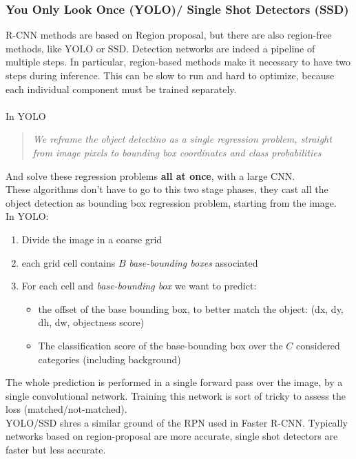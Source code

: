 \subsubsection{You Only Look Once (YOLO)/ Single Shot Detectors (SSD)}
R-CNN methods are based on Region proposal, but there are also region-free methods, like YOLO or SSD. Detection networks are indeed a pipeline of multiple steps. In particular, region-based methods make it necessary to have two steps during inference. This can be slow to run and hard to optimize, because each individual component must be trained separately.\\ \\
In YOLO 
\begin{quote}
    \textit{We reframe the object detectino as a single regression problem, straight from image pixels to bounding box coordinates and class probabilities}
\end{quote}{}
And solve these regression problems \textbf{all at once}, with a large CNN. \\
These algorithms don't have to go to this two stage phases, they cast all the object detection as bounding box regression problem, starting from the image. \\

In YOLO: 
\begin{enumerate}
    \item Divide the image in a coarse grid
    \item each grid cell contains $B$ \textit{base-bounding boxes} associated
    \item For each cell and \textit{base-bounding box} we want to predict: 
    \begin{itemize}
        \item the offset of the base bounding box, to better match the object: (dx, dy, dh, dw, objectness score)
        \item The classification score of the base-bounding box over the $C$ considered categories (including background)
    \end{itemize}{}
\end{enumerate}{}

The whole prediction is performed in a single forward pass over the image, by a single convolutional network. Training this network is sort of tricky to assess the loss (matched/not-matched).\\
YOLO/SSD shres a similar ground of the RPN used in Faster R-CNN. Typically networks based on region-proposal are more accurate, single shot detectors are faster but less accurate.
